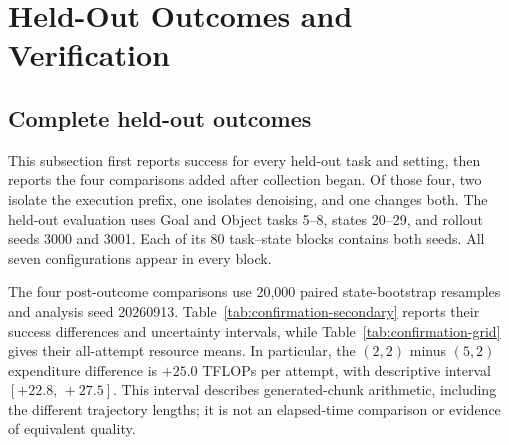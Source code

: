 \documentclass{article}
\begin{document}
\FloatBarrier
\section{Held-Out Outcomes and Verification}
\label{app:held-out-details}

\subsection{Complete held-out outcomes}
\label{app:confirmation-details}

This subsection first reports success for every held-out task and setting, then
reports the four comparisons added after collection began. Of those four, two
isolate the execution prefix, one isolates denoising, and one changes both.
The held-out evaluation uses Goal and Object tasks 5--8, states 20--29, and
rollout seeds 3000 and 3001. Each of its 80 task--state blocks contains both
seeds. All seven configurations appear in every block.

\begin{table}[htbp]
\centering\small
\caption{Held-out successes by task and configuration. Each task row has
20 attempts: ten paired initial states, each with two rollout seeds. The total
aggregates 160 attempts per configuration. The primary
$(2,2)$ setting exceeds $(2,5)$ on seven tasks and ties on one.}
\label{tab:primary-tasks}
\label{tab:confirmation-tasks}

\end{table}

\begin{table}[htbp]
\centering\small
\caption{Post-outcome descriptive comparisons using all 160 attempts per
setting. These contrasts were defined after collection began and were not
prespecified or fully outcome-blind. Intervals are task-conditional,
unadjusted, and do not test whether two settings preserve quality within a
prespecified margin.}
\label{tab:confirmation-secondary}

\end{table}
\FloatBarrier

The four post-outcome comparisons use
20,000 paired state-bootstrap resamples and analysis seed 20260913.
Table~\ref{tab:confirmation-secondary} reports their success differences and
uncertainty intervals, while
Table~\ref{tab:confirmation-grid} gives their all-attempt resource means.
In particular, the $(2,2)$ minus $(5,2)$ expenditure difference is
$+25.0$ TFLOPs per attempt, with descriptive interval $[+22.8,\,+27.5]$.
This interval describes generated-chunk arithmetic, including the different
trajectory lengths; it is not an elapsed-time comparison or evidence of
equivalent quality.
\end{document}
